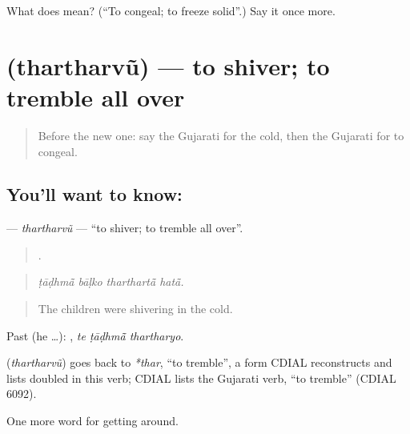 \begin{tcolorbox}[breakable,colback=teal!4,colframe=teal!35!black,title={Before you move on}]
What does  mean? (\textquotedblleft{}To congeal; to freeze solid\textquotedblright{}.) Say it once more.
\end{tcolorbox}
\section[\texorpdfstring{\gu{થરથરવું} (thartharvũ)}{થરથરવું (thartharvũ)}]{ (thartharvũ) — to shiver; to tremble all over}

\label{lesson:GU-C437-thartharvu}



\begin{quote}
Before the new one: say the Gujarati for the cold, then the Gujarati for to congeal.
\end{quote}

\subsection*{You'll want to know: }
\textbf{} — \emph{thartharvũ} — \textquotedblleft{}to shiver; to tremble all over\textquotedblright{}.

\begin{quote}
   .
\end{quote}

\begin{quote}
\emph{ṭāḍhmā̃ bāḷko tharthartā̃ hatā̃.}
\end{quote}

\begin{quote}
The children were shivering in the cold.
\end{quote}

Past (he …):   , \emph{te ṭāḍhmā̃ thartharyo}.

\begin{cousinweb}
\textbf{} (\emph{thartharvũ}) goes back to \emph{*thar}, \textquotedblleft{}to tremble\textquotedblright{}, a form CDIAL reconstructs and lists doubled in this verb; CDIAL lists the Gujarati verb, \textquotedblleft{}to tremble\textquotedblright{} (CDIAL 6092).
\end{cousinweb}

\begin{grammarlens}[title={What you've built}]
One more word for getting around.
\end{grammarlens}

